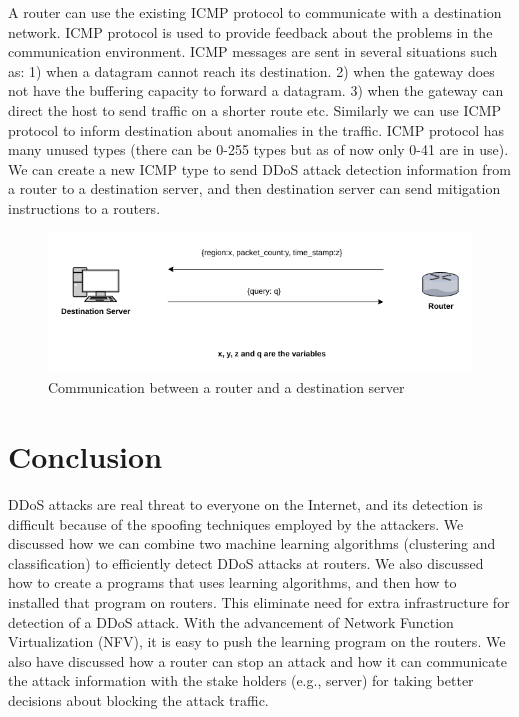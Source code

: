 \documentclass[12pt,oneside,a4paper]{article}
\begin{document}
A router can use the existing ICMP protocol to communicate with a destination network. ICMP protocol is used to provide feedback about the problems in the communication environment. ICMP messages are sent in several situations such as: 1) when a datagram cannot reach its destination. 2) when the gateway does not have the buffering capacity to forward a datagram. 3) when the gateway can direct the host to send traffic on a shorter route etc.\cite{icmp} Similarly we can use ICMP protocol to inform destination about anomalies in the traffic. ICMP protocol has many unused types (there can be 0-255 types but as of now only 0-41 are in use). We can create a new ICMP type to send DDoS attack detection information from a router to a destination server, and then destination server can send mitigation instructions to a routers.

\begin{figure}[H]
\centering
\includegraphics[scale=0.5]{router-network-communication.png}
\caption{Communication between a router and a destination server} \label{fig:router-network-communication}
\end{figure}

\pagebreak
\section{Conclusion}

DDoS attacks are real threat to everyone on the Internet, and its detection is difficult because of the spoofing techniques employed by the attackers. We discussed how we can combine two machine learning algorithms (clustering and classification) to efficiently detect DDoS attacks at routers. We also discussed how to create a programs that uses learning algorithms, and then how to installed that program on routers. This eliminate need for extra infrastructure for detection of a DDoS attack. With the advancement of Network Function Virtualization (NFV), it is easy to push the learning program on the routers. We also have discussed how a router can stop an attack and how it can communicate the attack information with the stake holders (e.g., server) for taking better decisions about blocking the attack traffic.
\pagebreak

\singlespacing
\end{document}
